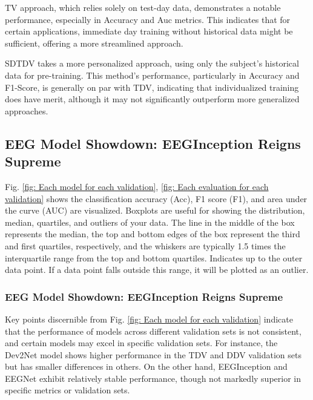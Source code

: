     TV approach, which relies solely on test-day data, demonstrates a notable performance, especially in Accuracy and Auc metrics. This indicates that for certain applications, immediate day training without historical data might be sufficient, offering a more streamlined approach.
    
   SDTDV takes a more personalized approach, using only the subject's historical data for pre-training. This method's performance, particularly in Accuracy and F1-Score, is generally on par with TDV, indicating that individualized training does have merit, although it may not significantly outperform more generalized approaches.
    \vspace{1mm}
    \subsection{EEG Model Showdown: EEGInception Reigns Supreme}
    \vspace{1mm}
    Fig. \ref{fig: Each model for each validation}, \ref{fig: Each evaluation  for each validation} shows the classification accuracy (Acc), F1 score (F1), and area under the curve (AUC) are visualized. Boxplots are useful for showing the distribution, median, quartiles, and outliers of your data. The line in the middle of the box represents the median, the top and bottom edges of the box represent the third and first quartiles, respectively, and the whiskers are typically 1.5 times the interquartile range from the top and bottom quartiles. Indicates up to the outer data point. If a data point falls outside this range, it will be plotted as an outlier.
    
    
    \subsubsection{EEG Model Showdown: EEGInception Reigns Supreme}
    Key points discernible from Fig. \ref{fig: Each model for each validation} indicate that the performance of models across different validation sets is not consistent, and certain models may excel in specific validation sets. For instance, the Dev2Net model shows higher performance in the TDV and DDV validation sets but has smaller differences in others. On the other hand, EEGInception and EEGNet exhibit relatively stable performance, though not markedly superior in specific metrics or validation sets.
    
